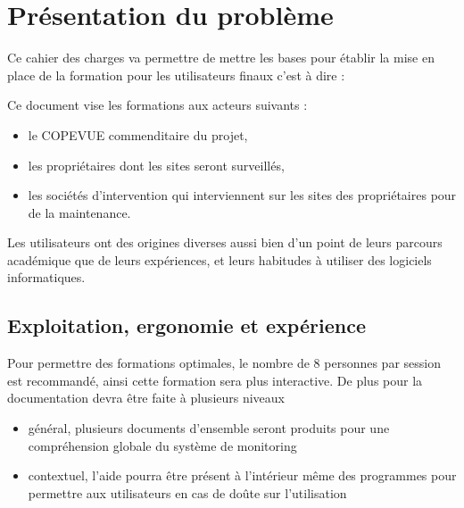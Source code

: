 \section{Présentation du problème}

Ce cahier des charges va permettre de mettre les bases pour établir la mise 
en place de la formation pour les utilisateurs finaux c'est à dire : 

Ce document vise les formations aux acteurs suivants : 
\begin{itemize}
	\item le COPEVUE commenditaire du projet,
	\item les propriétaires dont les sites seront surveillés,
	\item les sociétés d'intervention qui interviennent sur les sites des 
	propriétaires pour de la maintenance.
\end{itemize}


Les utilisateurs ont des origines diverses aussi bien d'un point de leurs parcours
 académique que de leurs expériences, et leurs habitudes à utiliser des logiciels
informatiques.




\subsection{Exploitation, ergonomie et expérience}

Pour permettre des formations optimales, le nombre de 8 personnes par session est
recommandé, ainsi cette formation sera plus interactive. 
De plus pour la documentation devra être faite à plusieurs niveaux 
\begin{itemize}
	\item général, plusieurs documents d'ensemble seront produits pour une compréhension
	globale du système de monitoring
	\item contextuel, l'aide pourra être présent à l'intérieur même des programmes pour
	permettre aux utilisateurs en cas de doûte sur l'utilisation
\end{itemize}

